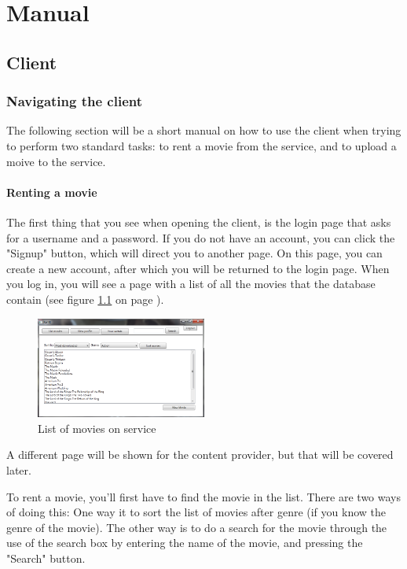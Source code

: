 \chapter{Manual}
\label{Manual}

\section{Client}
\label{Manual_Client}

\subsection{Navigating the client}
\label{Manual_Client_Navigation}
The following section will be a short manual on how to use the client when trying to perform two standard tasks: to rent a movie from the service, and to upload a moive to the service.

\subsubsection{Renting a movie}
\label{Manual_Client_Navigation_Rent}
The first thing that you see when opening the client, is the login page that asks for a username and a password. If you do not have an account, you can click the "Signup" button, which will direct you to another page. On this page, you can create a new account, after which you will be returned to the login page. When you log in, you will see a page with a list of all the movies that the database contain (see figure \ref{fig:Manual_Client_Navigation_Rent_List} on page \pageref{fig:Manual_Client_Navigation_Rent_List}).

\begin{figure}[h!] 
  \centering
 \includegraphics[width=0.5\textwidth]{Parts/Images/Manual/Listmovies}
\caption{List of movies on service}
\label{fig:Manual_Client_Navigation_Rent_List}
\end{figure}
 
A different page will be shown for the content provider, but that will be covered later.

To rent a movie, you'll first have to find the movie in the list. There are two ways of doing this: One way it to sort the list of movies after genre (if you know the genre of the movie). The other way is to do a search for the movie through the use of the search box by entering the name of the movie, and pressing the "Search" button.

